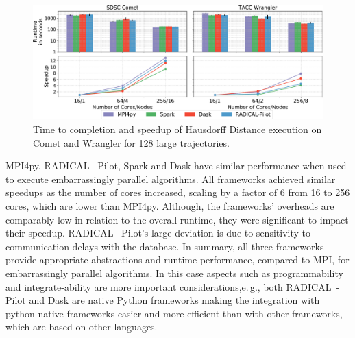 \begin{figure}[t]
    \centering
    \includegraphics[width=.95\textwidth]{figures/data_analytics_hpc/task_par/comet_wrangler_haus.pdf}
    \caption{Time to completion and speedup of Hausdorff Distance execution on Comet and Wrangler for 128 large trajectories.} 
    \label{fig:comet_wrangler_haus}
\end{figure}

MPI4py, RADICAL~-Pilot, Spark and Dask have similar performance when used to execute embarrassingly parallel algorithms.
All frameworks achieved similar speedups as the number of cores increased, scaling by a factor of 6 from 16 to 256 cores, which are lower than MPI4py.
Although, the frameworks' overheads are comparably low in relation to the overall runtime, they were significant to impact their speedup.
RADICAL~-Pilot's large deviation is due to sensitivity to communication delays with the database.
In summary, all three frameworks provide appropriate abstractions and runtime performance, compared to MPI, for embarrassingly parallel algorithms. 
In this case aspects such as programmability and integrate-ability are more important considerations,e.\,g., both RADICAL~-Pilot and Dask are native Python frameworks making the integration with python native frameworks easier and more efficient than with other frameworks, which are based on other languages.



